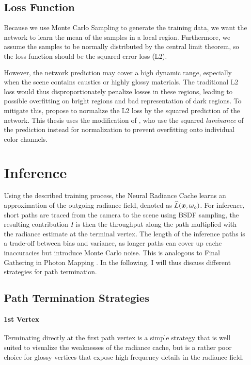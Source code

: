 \subsection{Loss Function}
Because we use Monte Carlo Sampling to generate the training data, we want the network to learn the mean of the samples in a local region.
Furthermore, we assume the samples to be normally distributed by the central limit theorem, so the loss function should be the squared error loss (L2).

However, the network prediction may cover a high dynamic range, especially when the scene contains caustics or highly glossy materials.
The traditional L2 loss would thus disproportionately penalize losses in these regions, leading to possible overfitting on bright regions and bad representation of dark regions.
To mitigate this, \textcite{lehtinen2018} propose to normalize the L2 loss by the squared prediction of the network.
This thesis uses the modification of \textcite{muller2021}, who use the squared \emph{luminance} of the prediction instead for normalization to prevent overfitting onto individual color channels.

\section{Inference}
Using the described training process, the Neural Radiance Cache learns an approximation of the outgoing radiance field, denoted as $\widehat{L}(\bm{x}, {\bm{\omega}_o})$.
For inference, short paths are traced from the camera to the scene using BSDF sampling, the resulting contribution $I$ is then the throughput along the path multiplied with the radiance estimate at the terminal vertex.
The length of the inference paths is a trade-off between bias and variance, as longer paths can cover up cache inaccuracies but introduce Monte Carlo noise.
This is analogous to Final Gathering in Photon Mapping \parencite{jensen1996}.
In the following, I will thus discuss different strategies for path termination.

\subsection{Path Termination Strategies}
\label{sec:path_termination}
\paragraph{1st Vertex}
\label{par:pt_1st_vertex}
Terminating directly at the first path vertex is a simple strategy that is well suited to visualize the weaknesses of the radiance cache, but is a rather poor choice for glossy vertices that expose high frequency details in the radiance field.

